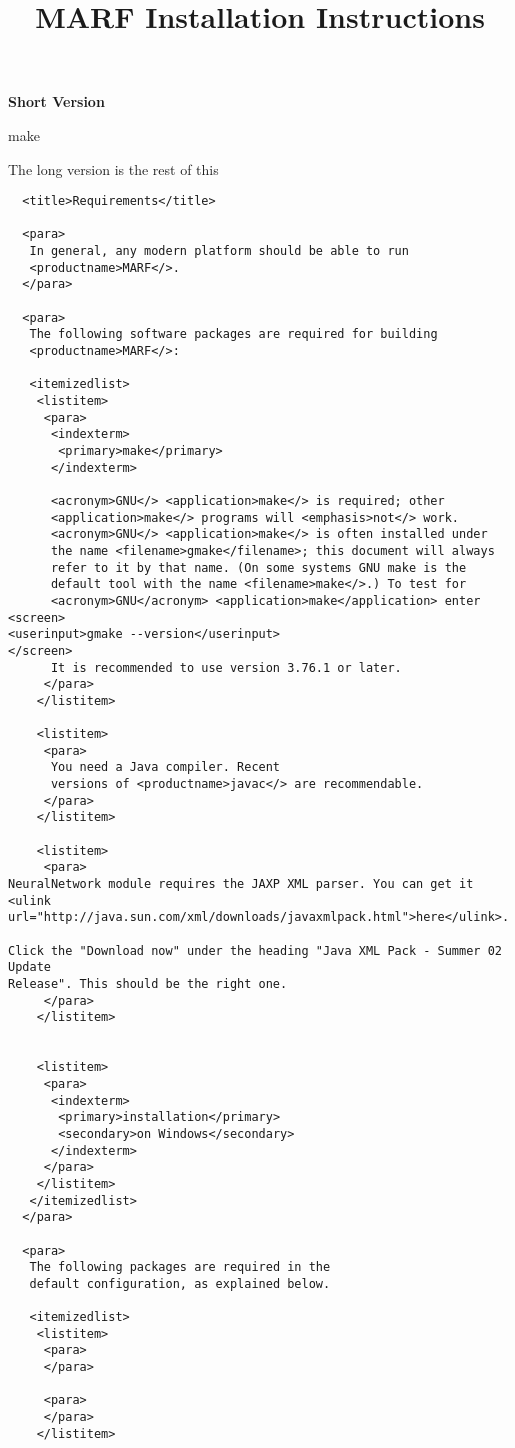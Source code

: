  \title{MARF Installation Instructions}

  {\bf Short Version}

make


   The long version is the rest of this

\begin{verbatim}
  <title>Requirements</title>

  <para>
   In general, any modern platform should be able to run
   <productname>MARF</>.
  </para>

  <para>
   The following software packages are required for building
   <productname>MARF</>:

   <itemizedlist>
    <listitem>
     <para>
      <indexterm>
       <primary>make</primary>
      </indexterm>

      <acronym>GNU</> <application>make</> is required; other
      <application>make</> programs will <emphasis>not</> work.
      <acronym>GNU</> <application>make</> is often installed under
      the name <filename>gmake</filename>; this document will always
      refer to it by that name. (On some systems GNU make is the
      default tool with the name <filename>make</>.) To test for
      <acronym>GNU</acronym> <application>make</application> enter
<screen>
<userinput>gmake --version</userinput>
</screen>
      It is recommended to use version 3.76.1 or later.
     </para>
    </listitem>

    <listitem>
     <para>
      You need a Java compiler. Recent
      versions of <productname>javac</> are recommendable.
     </para>
    </listitem>

    <listitem>
     <para>
NeuralNetwork module requires the JAXP XML parser. You can get it
<ulink url="http://java.sun.com/xml/downloads/javaxmlpack.html">here</ulink>.

Click the "Download now" under the heading "Java XML Pack - Summer 02 Update
Release". This should be the right one.
     </para>
    </listitem>


    <listitem>
     <para>
      <indexterm>
       <primary>installation</primary>
       <secondary>on Windows</secondary>
      </indexterm>
     </para>
    </listitem>
   </itemizedlist>
  </para>

  <para>
   The following packages are required in the
   default configuration, as explained below.

   <itemizedlist>
    <listitem>
     <para>
     </para>

     <para>
     </para>
    </listitem>


\end{verbatim}

